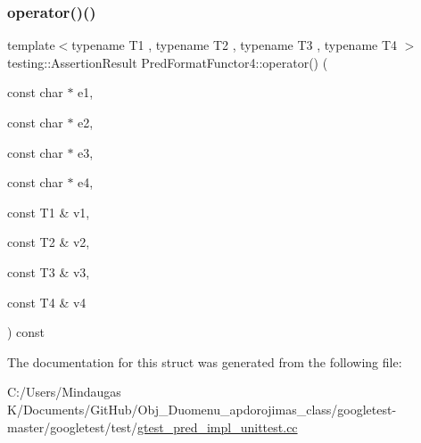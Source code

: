 \mbox{\label{struct_pred_format_functor4_a97061d2b9eadf357f4e50a75f5a9af5b}} 
\subsubsection{\texorpdfstring{operator()()}{operator()()}\hspace{0.1cm}{\footnotesize\ttfamily [3/3]}}
{\footnotesize\ttfamily template$<$typename T1 , typename T2 , typename T3 , typename T4 $>$ \\
testing\+::\+Assertion\+Result Pred\+Format\+Functor4\+::operator() (\begin{DoxyParamCaption}\item[{const char $\ast$}]{e1,  }\item[{const char $\ast$}]{e2,  }\item[{const char $\ast$}]{e3,  }\item[{const char $\ast$}]{e4,  }\item[{const T1 \&}]{v1,  }\item[{const T2 \&}]{v2,  }\item[{const T3 \&}]{v3,  }\item[{const T4 \&}]{v4 }\end{DoxyParamCaption}) const\hspace{0.3cm}{\ttfamily [inline]}}



The documentation for this struct was generated from the following file\+:\begin{DoxyCompactItemize}
\item 
C\+:/\+Users/\+Mindaugas K/\+Documents/\+Git\+Hub/\+Obj\+\_\+\+Duomenu\+\_\+apdorojimas\+\_\+class/googletest-\/master/googletest/test/\mbox{\hyperlink{googletest-master_2googletest_2test_2gtest__pred__impl__unittest_8cc}{gtest\+\_\+pred\+\_\+impl\+\_\+unittest.\+cc}}\end{DoxyCompactItemize}
